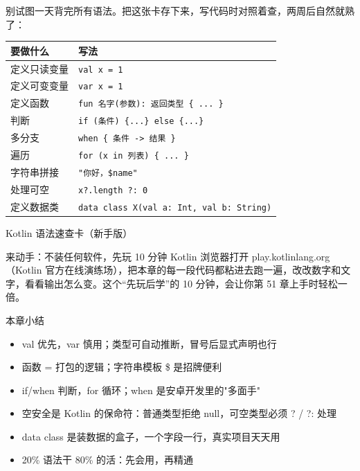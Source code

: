 
别试图一天背完所有语法。把这张卡存下来，写代码时对照着查，两周后自然就熟了：

\begin{center}
\begin{tabularx}{\linewidth}{|X|X|}
\hline
\textbf{要做什么} & \textbf{写法} \tabularnewline
\hline
定义只读变量 & \texttt{val x = 1} \tabularnewline
定义可变变量 & \texttt{var x = 1} \tabularnewline
定义函数 & \texttt{fun 名字(参数): 返回类型 \{ ... \}} \tabularnewline
判断 & \texttt{if (条件) \{...\} else \{...\}} \tabularnewline
多分支 & \texttt{when \{ 条件 -> 结果 \}} \tabularnewline
遍历 & \texttt{for (x in 列表) \{ ... \}} \tabularnewline
字符串拼接 & \texttt{"你好，\$name"} \tabularnewline
处理可空 & \texttt{x?.length ?: 0} \tabularnewline
定义数据类 & \texttt{data class X(val a: Int, val b: String)} \tabularnewline
\hline
\end{tabularx}
\end{center}

\begin{center}\small\color{gray}Kotlin 语法速查卡（新手版）\end{center}

\begin{tcbpractice}{来动手：不装任何软件，先玩 10 分钟 Kotlin}
浏览器打开 play.kotlinlang.org（Kotlin 官方在线演练场），把本章的每一段代码都粘进去跑一遍，改改数字和文字，看看输出怎么变。这个“先玩后学”的 10 分钟，会让你第 51 章上手时轻松一倍。

\end{tcbpractice}

\begin{tcbsummary}{本章小结}
\begin{itemize}
  \item val 优先，var 慎用；类型可自动推断，冒号后显式声明也行
  \item 函数 = 打包的逻辑；字符串模板 \$ 是招牌便利
  \item if/when 判断，for 循环；when 是安卓开发里的"多面手"
  \item 空安全是 Kotlin 的保命符：普通类型拒绝 null，可空类型必须 ? / ?: 处理
  \item data class 是装数据的盒子，一个字段一行，真实项目天天用
  \item 20\% 语法干 80\% 的活：先会用，再精通
\end{itemize}

\end{tcbsummary}
